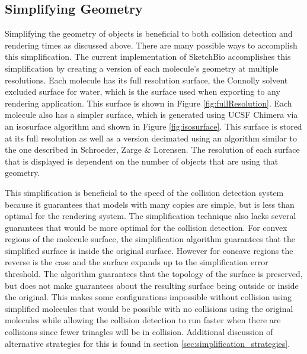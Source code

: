 \documentclass{article} %
\begin{document}
\subsection{Simplifying Geometry}
Simplifying the geometry of objects is beneficial to both collision detection and rendering times as discussed above.  There are many possible ways to accomplish this simplification\cite{luebke2001developer}.  The current implementation of SketchBio accomplishes this simplification by creating a version of each molecule's geometry at multiple resolutions. Each molecule has its full resolution surface, the Connolly solvent excluded surface for water, which is the surface used when exporting to any rendering application. This surface is shown in Figure \ref{fig:fullResolution}. Each molecule also has a simpler surface, which is generated using UCSF Chimera via an isosurface algorithm and shown in Figure \ref{fig:isosurface}. This surface is stored at its full resolution as well as a version decimated using an algorithm similar to the one described in Schroeder, Zarge \& Lorensen\cite{schroeder1992decimation}.  The resolution of each surface that is displayed is dependent on the number of objects that are using that geometry.

This simplification is beneficial to the speed of the collision detection system because it guarantees that models with many copies are simple, but is less than optimal for the rendering system.  The simplification technique also lacks several guarantees that would be more optimal for the collision detection.  For convex regions of the molecule surface, the simplification algorithm guarantees that the simplified surface is inside the original surface.  However for concave regions the reverse is the case and the surface expands up to the simplification error threshold.  The algorithm guarantees that the topology of the surface is preserved, but does not make guarantees about the resulting surface being outside or inside the original.  This makes some configurations impossible without collision using simplified molecules that would be possible with no collisions using the original molecules while allowing the collision detection to run faster when there are collisions since fewer trinagles will be in collision.  Additional discussion of alternative strategies for this is found in section \ref{sec:simplification_strategies}.
\end{document}
